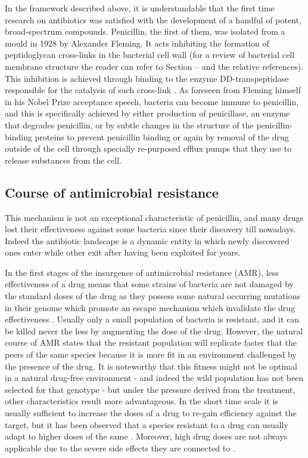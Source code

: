 In the framework described above, it is understandable that the first time research on antibiotics was satisfied with the development of a handful of potent, broad-spectrum compounds.
%
Penicillin, the first of them, was isolated from a mould in 1928 by Alexander Fleming. It acts inhibiting the formation of peptidoglycan cross-links in the bacterial cell wall (for a review of bacterial cell membrane structure the reader can refer to Section -- and the relative references). This inhibition is achieved through binding to the enzyme DD-transpeptidase responsible for the catalysis of such cross-link \cite{Gordon2000}.
%
As foreseen from Fleming himself in his Nobel Prize acceptance speech, bacteria can become immune to penicillin, and this is specifically achieved by either production of penicillase, an enzyme that degrades penicillin, or by subtle changes in the structure of the penicillin-binding proteins to prevent penicillin binding or again by removal of the drug outside of the cell through specially re-purposed efflux pumps that they use to release substances from the cell.

\subsection{Course of antimicrobial resistance} \label{sec:course_AMR}
This mechanism is not an exceptional characteristic of penicillin, and many drugs lost their effectiveness against some bacteria since their discovery till nowadays. Indeed the antibiotic landscape is a dynamic entity in which newly discovered ones enter while other exit after having been exploited for years.

In the first stages of the insurgence of antimicrobial resistance (AMR), less effectiveness of a drug means that some strains of bacteria are not damaged by the standard doses of the drug as they possess some natural occurring mutations in their genome which promote an escape mechanism which invalidate the drug effectiveness \cite{Kapoor2017,Blair2014}. Usually only a small population of bacteria is resistant, and it can be killed never the less by augmenting the dose of the drug. However, the natural course of AMR states that the resistant population will replicate faster that the peers of the same species because it is more fit in an environment challenged by the presence of the drug. It is noteworthy that this fitness might not be optimal in a natural drug-free environment - and indeed the wild population has not been selected for that genotype - but under the pressure derived from the treatment, other characteristics result more advantageous.
%
In the short time scale it is usually sufficient to increase the doses of a drug to re-gain efficiency against the target, but it has been observed that a species resistant to a drug can usually adapt to higher doses of the same \cite{????}. Moreover, high drug doses are not always applicable due to the severe side effects they are connected to \cite{????}.

